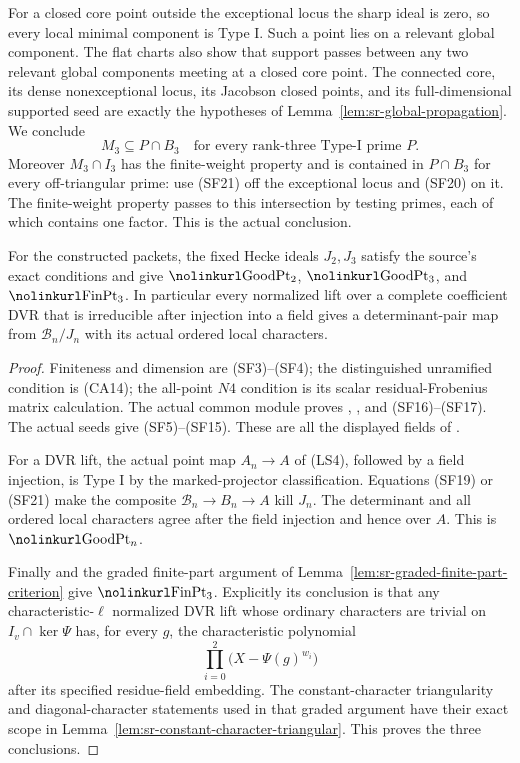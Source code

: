 For a closed core point outside the
exceptional locus the sharp ideal is zero,
so every local minimal component is Type I.
Such a point lies on a relevant global
component. The flat charts also show that
support passes between any two relevant
global components meeting at a closed
core point. The connected core, its dense
nonexceptional locus, its Jacobson
closed points, and its full-dimensional
supported seed are exactly the hypotheses
of Lemma~\ref{lem:sr-global-propagation}.
We conclude
\[
 M_3\subseteq P\cap B_3
                 \quad\text{for every rank-three Type-I prime }P .
                                                               \tag{SF21}
\]
Moreover \(M_3\cap I_3\) has the finite-weight
property and is contained in \(P\cap B_3\)
for every off-triangular prime:
use (SF21) off the exceptional locus and
(SF20) on it. The finite-weight property
passes to this intersection by testing
primes, each of which contains one factor.
This is the actual  conclusion.

\begin{srproposition}
\label{prop:actual-common-two-three-endpoint}
For the constructed packets, the fixed Hecke ideals
\(J_2,J_3\) satisfy the source's exact
 conditions and give
\(\srcid{GoodPt}_2\), \(\srcid{GoodPt}_3\), and
\(\srcid{FinPt}_3\).
In particular every normalized lift over a complete
coefficient DVR that is irreducible after injection
into a field gives a determinant-pair map from
\(\mathcal B_n/J_n\) with its actual ordered local
characters.
\end{srproposition}

\begin{proof}
Finiteness and dimension are (SF3)--(SF4);
the distinguished unramified condition is (CA14);
the all-point \(N4\) condition is its scalar
residual-Frobenius matrix calculation.
The actual common module proves
, , and
(SF16)--(SF17). The actual seeds give
(SF5)--(SF15). These are all the displayed
fields of .

For a DVR lift, the actual point map
\(A_n\to A\) of (LS4), followed by a field
injection, is Type I by the marked-projector
classification. Equations (SF19) or (SF21)
make the composite
\(\mathcal B_n\to B_n\to A\) kill \(J_n\).
The determinant and all ordered local
characters agree after the field injection
and hence over \(A\). This is
\(\srcid{GoodPt}_n\).

Finally  and the graded
finite-part argument of
Lemma~\ref{lem:sr-graded-finite-part-criterion}
give \(\srcid{FinPt}_3\).
Explicitly its conclusion is that any
characteristic-\(\ell\) normalized DVR lift
whose ordinary characters are trivial on
\(I_v\cap\ker\Psi\) has, for every \(g\),
the characteristic polynomial
\[
       \prod_{i=0}^{2}
          \bigl(X-\Psi(g)^{w_i}\bigr)
\]
after its specified residue-field embedding.
The constant-character triangularity and
diagonal-character statements used in that
graded argument have their exact scope in
Lemma~\ref{lem:sr-constant-character-triangular}.
This proves the three conclusions.
\end{proof}

